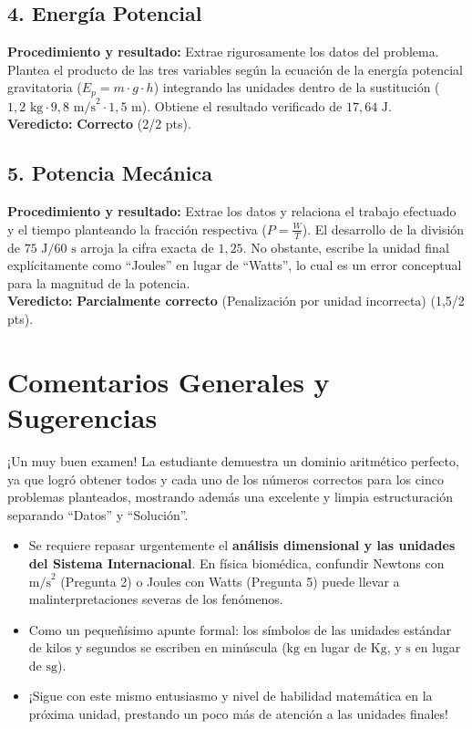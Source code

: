 \documentclass[12pt,letterpaper]{article}
\begin{document}
\subsection*{4. Energía Potencial}
\textbf{Procedimiento y resultado:} Extrae rigurosamente los datos del problema. Plantea el producto de las tres variables según la ecuación de la energía potencial gravitatoria ($E_p = m \cdot g \cdot h$) integrando las unidades dentro de la sustitución ($1,2 \text{ kg} \cdot 9,8 \text{ m/s}^2 \cdot 1,5 \text{ m}$). Obtiene el resultado verificado de $17,64 \text{ J}$. \\
\textbf{Veredicto:} \textbf{Correcto} (2/2 pts).

\subsection*{5. Potencia Mecánica}
\textbf{Procedimiento y resultado:} Extrae los datos y relaciona el trabajo efectuado y el tiempo planteando la fracción respectiva ($P = \frac{W}{T}$). El desarrollo de la división de $75 \text{ J} / 60 \text{ s}$ arroja la cifra exacta de $1,25$. No obstante, escribe la unidad final explícitamente como ``Joules'' en lugar de ``Watts'', lo cual es un error conceptual para la magnitud de la potencia. \\
\textbf{Veredicto:} \textbf{Parcialmente correcto} (Penalización por unidad incorrecta) (1,5/2 pts).

\vspace{0.5cm}
\section*{Comentarios Generales y Sugerencias}
¡Un muy buen examen! La estudiante demuestra un dominio aritmético perfecto, ya que logró obtener todos y cada uno de los números correctos para los cinco problemas planteados, mostrando además una excelente y limpia estructuración separando ``Datos'' y ``Solución''.
\begin{itemize}
    \item Se requiere repasar urgentemente el \textbf{análisis dimensional y las unidades del Sistema Internacional}. En física biomédica, confundir Newtons con $\text{m/s}^2$ (Pregunta 2) o Joules con Watts (Pregunta 5) puede llevar a malinterpretaciones severas de los fenómenos.
    \item Como un pequeñísimo apunte formal: los símbolos de las unidades estándar de kilos y segundos se escriben en minúscula ($\text{kg}$ en lugar de $\text{Kg}$, y $\text{s}$ en lugar de $\text{sg}$).
    \item ¡Sigue con este mismo entusiasmo y nivel de habilidad matemática en la próxima unidad, prestando un poco más de atención a las unidades finales!
\end{itemize}
\end{document}
